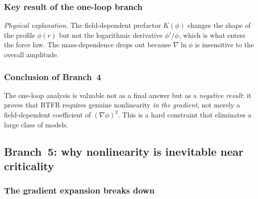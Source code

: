 \documentclass[11pt,a4paper]{article}
\numberwithin{equation}{section}
\begin{document}
\subsubsection{Key result of the one-loop branch}

\begin{center}
\end{center}

\emph{Physical explanation.} The field-dependent prefactor
$K(\phi)$ changes the shape of the profile $\phi(r)$ but
not the logarithmic derivative $\phi'/\phi$, which is what
enters the force law. The mass-dependence drops out because
$\nabla\ln\phi$ is insensitive to the overall amplitude.

\subsubsection{Conclusion of Branch~4}

The one-loop analysis is valuable not as a final answer but as a
\emph{negative result}: it proves that BTFR requires genuine
nonlinearity \emph{in the gradient}, not merely a
field-dependent coefficient of $(\nabla\phi)^2$. This is a hard
constraint that eliminates a large class of models.


\subsection{Branch~5: why nonlinearity is inevitable near
criticality}
\label{app:lof:branch5}

\subsubsection{The gradient expansion breaks down}
\end{document}
